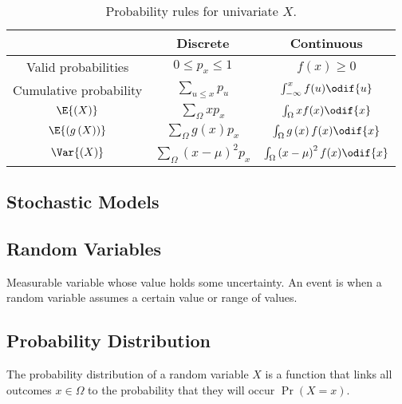 \documentclass{article}
\begin{document}
\begin{minipage}{126.1962963mm}
    \begin{table}[H]
        \centering
        \begin{tabular}{c c c }
            \toprule
                                                     & \textbf{Discrete}                              & \textbf{Continuous}                                    \\
            \midrule
            Valid probabilities                      & \(0 \leq p_x \leq 1\)                          & \(f(x) \geq 0\)                                        \\
            Cumulative probability                   & \(\sum_{u \leq x} p_u\)                        & \(\int_{-\infty}^{x} f(u) \odif{u}\)                   \\
            \(\E{\left( X \right)}\)                 & \(\sum_{\Omega} xp_x\)                         & \(\int_{\Omega} xf(x)\odif{x}\)                        \\
            \(\E{\left( g\left( X \right) \right)}\) & \(\sum_{\Omega} g\left( x \right)p_x\)         & \(\int_{\Omega} g\left( x \right)f(x)\odif{x}\)        \\
            \(\Var{\left( X \right)}\)               & \(\sum_{\Omega} \left( x - \mu \right)^2 p_x\) & \(\int_{\Omega} \left( x - \mu \right)^2f(x)\odif{x}\) \\
            \bottomrule
        \end{tabular}
        \caption{Probability rules for univariate \(X\).} %
    \end{table}
    \begin{multicols}{2}
        \section{Stochastic Models}
        \subsection{Random Variables}
        Measurable variable whose value holds some uncertainty. An
        event is when a random variable assumes a certain value or
        range of values.
        \subsection{Probability Distribution}
        The probability distribution of a random variable \(X\) is a
        function that links all outcomes \(x \in \Omega\) to the
        probability that they will occur \(\Pr{\left( X = x \right)}\).

\end{multicols}
\end{minipage}
\end{document}

